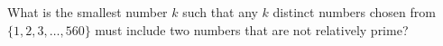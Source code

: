 What is the smallest number $k$ such that any $k$ distinct numbers chosen from $\{1,2,3,\dots,560\}$ must include two numbers that are not relatively prime?
